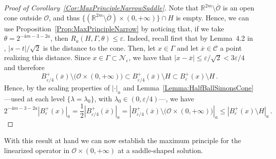 \documentclass[12pt,reqno]{amsart}
\theoremstyle{definition}
\theoremstyle{remark}
\newcommand{\con}[1]{\mathbb{#1}}
\newcommand{\R}{\con{R}} %
\newcommand{\ccal}{\mathscr{C}}
\newcommand{\ncal}{\mathcal{N}}
\newcommand{\ocal}{\mathcal{O}}
\numberwithin{equation}{section}
\begin{document}
\begin{proof}[Proof of Corollary~\ref{Cor:MaxPrincipleNarrowSaddle}]
Note that $\R^{2m} \setminus \overline{\ocal}$ is an open cone outside $\ocal$, and thus $\{ (\R^{2m} \setminus \overline{\ocal}) \times (0, +\infty) \} \cap H $ is empty. Hence, we can use Proposition~\ref{Prop:MaxPrincipleNarrow} by noticing that,  if we take $\theta = 2^{-4m - 3-2a}$, then $R_a(H,\Gamma,\theta)\leq \varepsilon$. Indeed, recall first that by Lemma~4.2 in \cite{CabreTerraI}, $|s-t|/\sqrt{2}$ is the distance to the cone. Then, let $x\in \Gamma$ and let $\overline{x}\in \ccal$ a point realizing this distance. Since $x\in \Gamma \subset \ncal_\varepsilon$, we have that $|x-\overline{x}| \leq \varepsilon /\sqrt{2} < 3\varepsilon /4$ and therefore
$$
B_{\varepsilon/4}^+ (\overline{x})\setminus \big( \ocal \times (0, +\infty)\big) \subset B_{\varepsilon/4}^+ (\overline{x})\setminus H \subset B_\varepsilon^+ (x)\setminus H\,.
$$
Hence, by the scaling properties of $|\cdot|_a$ and Lemma~\ref{Lemma:HalfBallSimonsCone} ---used at each level $\{\lambda = \lambda_0\}$, with $\lambda_0\in (0,\varepsilon/4)$---, we have
$$
2^{-4m - 3-2a} |B^+_\varepsilon (x)|_a = \dfrac{1}{2} |B_{\varepsilon/4}^+(\overline{x}) |_a = |B_{\varepsilon/4}^+ (\overline{x})\setminus \big( \ocal \times (0, +\infty)\big)  |_a \leq |B_\varepsilon^+ (x)\setminus H |_a\,.
$$
\end{proof}


With this result at hand we can now establish the maximum principle for the linearized operator in $\ocal\times (0,+\infty)$ at a saddle-shaped solution.
\end{document}
